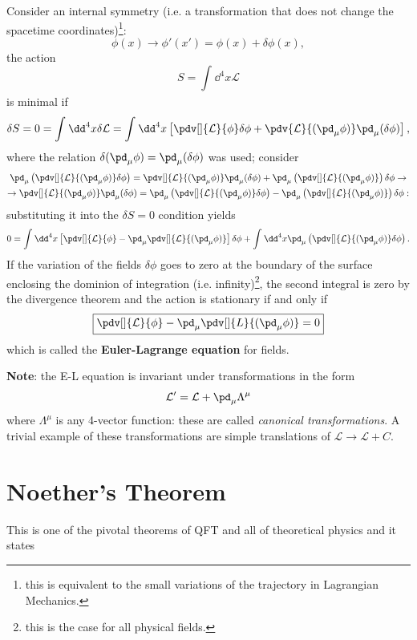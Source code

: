 Consider an internal symmetry (i.e. a transformation that does not change the
spacetime coordinates)\footnote{this is equivalent to the small variations of the
trajectory in Lagrangian Mechanics.}:
$$\phi(x)\rightarrow \phi'(x')=\phi(x)+\delta\phi(x),$$
the action
$$S=\int_{}^{}\dd^4x\mathcal{L}$$
is minimal if
$$\delta S =0 = \int_{}^{}\dd^4x\delta\mathcal{L} = 
\int_{}^{}\dd^4x \left[\pdv[]{\mathcal{L}}{\phi}\delta\phi + \pdv{\mathcal{L}}
{(\pd_\mu\phi)}\pd_\mu(\delta\phi)\right],
$$
where the relation $\delta(\pd_\mu\phi) = \pd_\mu(\delta\phi)$ was used;
consider
\begin{gather*}
\pd_\mu\left(\pdv[]{\mathcal{L}}{(\pd_\mu\phi)}\delta\phi\right) = 
\pdv[]{\mathcal{L}}{(\pd_\mu\phi)}\pd_\mu(\delta\phi)+\pd_\mu\left(
\pdv[]{\mathcal{L}}{(\pd_\mu\phi)}\right)\delta\phi \rightarrow\\
\rightarrow\pdv[]{\mathcal{L}}{(\pd_\mu\phi)}\pd_\mu(\delta\phi) = \pd_\mu\left(
\pdv[]{\mathcal{L}}{(\pd_\mu\phi)}\delta\phi
\right) - \pd_\mu\left(\pdv[]{\mathcal{L}}{(\pd_\mu\phi)}\right)\delta\phi:
\end{gather*}
substituting it into the $\delta S=0$ condition yields
$$0=\int_{}^{}\dd^4x\left[\pdv[]{\mathcal{L}}{\phi}-\pd_\mu\pdv[]{\mathcal{L}}
{(\pd_\mu\phi)}\right]\delta\phi + \int_{}^{}\dd^4x\pd_\mu\left(\pdv[]{\mathcal{L}}
{(\pd_\mu\phi)}\delta \phi\right).$$
If the variation of the fields $\delta\phi$ goes to zero at the boundary of the
surface enclosing the dominion of integration (i.e. infinity)\footnote{
this is the case for all physical fields.}, the second integral
is zero by the divergence theorem and the action is stationary if and only if
$$\boxed{\pdv[]{\mathcal{L}}{\phi}-\pd_\mu\pdv[]{L}{(\pd_\mu\phi)}=0}$$
which is called the \textbf{Euler-Lagrange equation} for fields.

\textbf{Note}: the E-L equation is invariant under transformations in the form
$$\mathcal{L}'=\mathcal{L}+\pd_\mu\Lambda^\mu$$
where $\Lambda^\mu$ is any 4-vector function: these are called \textit{canonical
transformations}. A trivial example of these transformations are simple translations
of $\mathcal{L}\rightarrow\mathcal{L}+C$.

\section{Noether's Theorem}
This is one of the pivotal theorems of QFT and all of theoretical physics and it
states

\noindent{}

